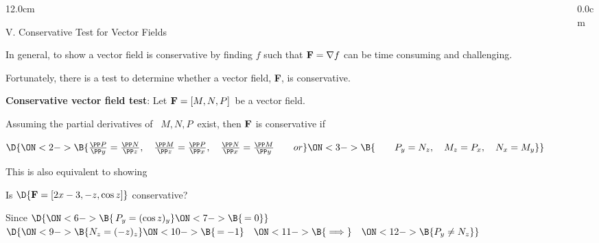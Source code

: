 \begin{frame}
\begin{columns}\begin{column}{12.0cm}

{V. Conservative Test for Vector Fields}

\vspace{0.3cm}

\scriptsize

In general, to show a vector field is conservative by finding $f$ such that ${\bf F} = \nabla f$ can be time consuming and challenging.

\vspace{0.5cm}

Fortunately, there is a test to determine whether a vector field, {\bf F}, is conservative.

\vspace{0.5cm}

{\bf Conservative vector field test}: \quad  Let ${\bf F} = [M,N,P]$\, be a vector field.  

\vspace{0.5cm}

Assuming the partial derivatives of \, $M, N, P$\,  exist, then ${\bf F}$ is conservative if 

\begin{center}
	$\D{
	\ON<2->{\B{
	\frac{\PP P}{\PP y} = \frac{\PP N}{\PP z}, \quad 
	\frac{\PP M}{\PP z} = \frac{\PP P}{\PP x}, \quad 
	\frac{\PP N}{\PP x} = \frac{\PP M}{\PP y} \qquad 
	or }}
	\ON<3->{\B{\qquad P_y = N_z, \quad M_z=P_x, \quad N_x=M_y}}}$
\end{center}

This is also equivalent to showing

\begin{center}
	 \quad 
	\ON<5->{\B{or \quad $\nabla \times {\bf F} = {\bf 0}$}}
\end{center}

\EX Is $\D{{\bf F} = [2x-3,-z,\cos z]}$ conservative?

\vspace{0.2cm}
Since $\D{
\ON<6->{\B{\, P_y = (\cos z)_y}}
\ON<7->{\B{\,= 0}}
}$ \quad 
{} \quad 
$\D{
\ON<9->{\B{N_z = (-z)_z}}
\ON<10->{\B{\, = -1}} \quad 
\ON<11->{\B{\implies}} \quad 
\ON<12->{\B{P_y \ne N_z}}}$

\vspace{0.2cm}


\vspace{1.2cm}

\end{column}\begin{column}{0.0cm}\end{column}\end{columns}
\end{frame}
